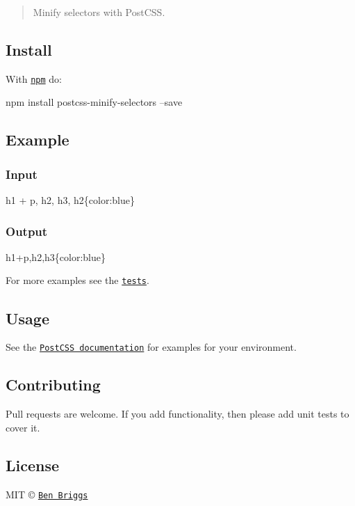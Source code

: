 \begin{quote}
Minify selectors with Post\+C\+SS. \end{quote}


\subsection*{Install}

With \href{https://www.npmjs.com/package/postcss-minify-selectors}{\tt npm} do\+:


\begin{DoxyCode}
npm install postcss-minify-selectors --save
\end{DoxyCode}


\subsection*{Example}

\subsubsection*{Input}


\begin{DoxyCode}
h1 + p, h2, h3, h2\{color:blue\}
\end{DoxyCode}


\subsubsection*{Output}


\begin{DoxyCode}
h1+p,h2,h3\{color:blue\}
\end{DoxyCode}


For more examples see the \href{test.js}{\tt tests}.

\subsection*{Usage}

See the \href{https://github.com/postcss/postcss#usage}{\tt Post\+C\+SS documentation} for examples for your environment.

\subsection*{Contributing}

Pull requests are welcome. If you add functionality, then please add unit tests to cover it.

\subsection*{License}

M\+IT © \href{http://beneb.info}{\tt Ben Briggs} 